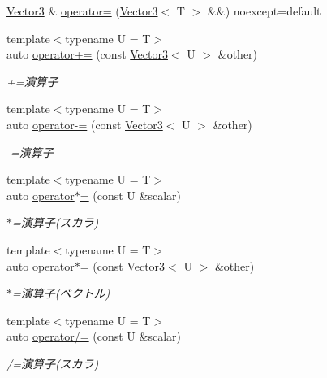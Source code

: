 \begin{DoxyCompactItemize}
\item 
\mbox{\hyperlink{classsaki_1_1_vector3}{Vector3}} \& \mbox{\hyperlink{classsaki_1_1_vector3_a738dc312cb0298040193cc17b737ed08}{operator=}} (\mbox{\hyperlink{classsaki_1_1_vector3}{Vector3}}$<$ T $>$ \&\&) noexcept=default
\item 
{\footnotesize template$<$typename U  = T$>$ }\\auto \mbox{\hyperlink{classsaki_1_1_vector3_a99b24e43486d76b449b23239c80f70d7}{operator+=}} (const \mbox{\hyperlink{classsaki_1_1_vector3}{Vector3}}$<$ U $>$ \&other)
\begin{DoxyCompactList}\small\item\em +=演算子 \end{DoxyCompactList}\item 
{\footnotesize template$<$typename U  = T$>$ }\\auto \mbox{\hyperlink{classsaki_1_1_vector3_a3c15f413dc1c0aaef7311bd6dbb7224d}{operator-\/=}} (const \mbox{\hyperlink{classsaki_1_1_vector3}{Vector3}}$<$ U $>$ \&other)
\begin{DoxyCompactList}\small\item\em -\/=演算子 \end{DoxyCompactList}\item 
{\footnotesize template$<$typename U  = T$>$ }\\auto \mbox{\hyperlink{classsaki_1_1_vector3_abcfc63ddcaa8c7f148debedbe7fca788}{operator$\ast$=}} (const U \&scalar)
\begin{DoxyCompactList}\small\item\em $\ast$=演算子(スカラ) \end{DoxyCompactList}\item 
{\footnotesize template$<$typename U  = T$>$ }\\auto \mbox{\hyperlink{classsaki_1_1_vector3_a7c68761dd40e55adf0dd8373c2b0e1a7}{operator$\ast$=}} (const \mbox{\hyperlink{classsaki_1_1_vector3}{Vector3}}$<$ U $>$ \&other)
\begin{DoxyCompactList}\small\item\em $\ast$=演算子(ベクトル) \end{DoxyCompactList}\item 
{\footnotesize template$<$typename U  = T$>$ }\\auto \mbox{\hyperlink{classsaki_1_1_vector3_aacf8494aa9c503f70bad8039e1f926b9}{operator/=}} (const U \&scalar)
\begin{DoxyCompactList}\small\item\em /=演算子(スカラ) \end{DoxyCompactList}\item 

\end{DoxyCompactItemize}
